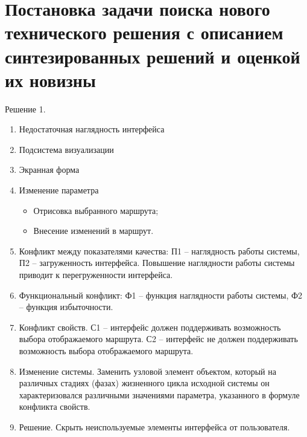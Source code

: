 \chapter{Постановка задачи поиска нового технического решения с описанием синтезированных решений и 
    оценкой их новизны}
Решение 1.
\begin{enumerate}
    \item Недостаточная наглядность интерфейса
    \item Подсистема визуализации
    \item Экранная форма
    \item Изменение параметра
    \begin{itemize}
        \item Отрисовка выбранного маршрута;
        \item Внесение изменений в маршрут.
    \end{itemize}
    \item Конфликт между показателями качества: П1 -- наглядность работы системы, 
        П2 -- загруженность интерфейса. Повышение наглядности работы системы приводит к 
        перегруженности интерфейса.
    \item Функциональный конфликт: Ф1 -- функция наглядности работы системы, Ф2 -- 
        функция избыточности.
    \item Конфликт свойств. С1 -- интерфейс должен поддерживать возможность выбора отображаемого 
        маршрута. С2 -- интерфейс не должен поддерживать возможность выбора отображаемого маршрута.
    \item Изменение системы. Заменить узловой элемент объектом, который на различных стадиях (фазах) 
        жизненного цикла исходной системы он характеризовался различными значениями параметра, 
        указанного в формуле конфликта свойств.
    \item Решение. Скрыть неиспользуемые элементы интерфейса от пользователя.
\end{enumerate}

\pagebreak

